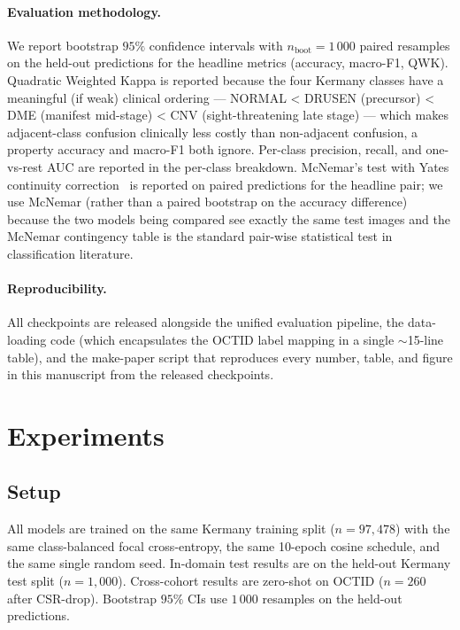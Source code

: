 \documentclass[5p]{elsarticle}
\begin{document}
\paragraph{Evaluation methodology.}
We report bootstrap $95\%$ confidence intervals with $n_{\text{boot}}=1\,000$ paired resamples on the held-out predictions for the headline metrics (accuracy, macro-F1, QWK). Quadratic Weighted Kappa is reported because the four Kermany classes have a meaningful (if weak) clinical ordering --- NORMAL < DRUSEN (precursor) < DME (manifest mid-stage) < CNV (sight-threatening late stage) --- which makes adjacent-class confusion clinically less costly than non-adjacent confusion, a property accuracy and macro-F1 both ignore. Per-class precision, recall, and one-vs-rest AUC are reported in the per-class breakdown. McNemar's test with Yates continuity correction~\citep{mcnemar1947note} is reported on paired predictions for the headline pair; we use McNemar (rather than a paired bootstrap on the accuracy difference) because the two models being compared see exactly the same test images and the McNemar contingency table is the standard pair-wise statistical test in classification literature.

\paragraph{Reproducibility.}
All checkpoints are released alongside the unified evaluation pipeline, the data-loading code (which encapsulates the OCTID label mapping in a single $\sim$15-line table), and the make-paper script that reproduces every number, table, and figure in this manuscript from the released checkpoints.


\section{Experiments}
\label{sec:expt}

\subsection{Setup}
All models are trained on the same Kermany training split ($n=97{,}478$) with the same class-balanced focal cross-entropy, the same 10-epoch cosine schedule, and the same single random seed. In-domain test results are on the held-out Kermany test split ($n=1{,}000$). Cross-cohort results are zero-shot on OCTID ($n=260$ after CSR-drop). Bootstrap $95\%$ CIs use $1\,000$ resamples on the held-out predictions.
\end{document}
